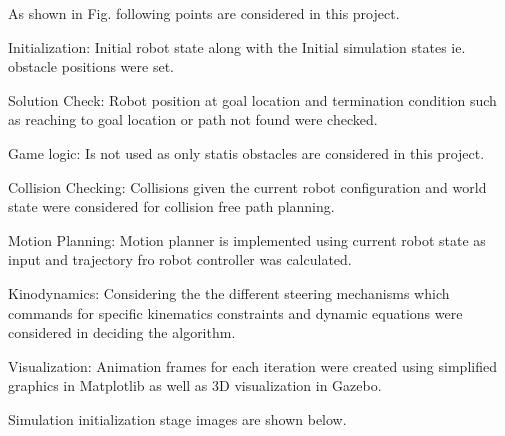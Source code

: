 \documentclass[12pt,a4paper]{article}
\begin{document}
As shown in Fig. following points are considered in this project.

Initialization: Initial robot state along with the Initial simulation states ie. obstacle positions were set.\par
Solution Check: Robot position at goal location and termination condition such as reaching to goal location or path not found were checked.\par
Game logic: Is not used as only statis obstacles are considered in this project.\par
Collision Checking: Collisions given the current robot configuration and world state were considered for collision free path planning.\par
Motion Planning: Motion planner is implemented using current robot state as input and trajectory fro robot controller was calculated.\par
Kinodynamics: Considering the the different steering mechanisms which commands for specific kinematics constraints and dynamic equations were considered in deciding the algorithm. \par
Visualization: Animation frames for each iteration were created using simplified graphics in Matplotlib as well as 3D visualization in Gazebo.\par

Simulation initialization stage images are shown below.
\end{document}
